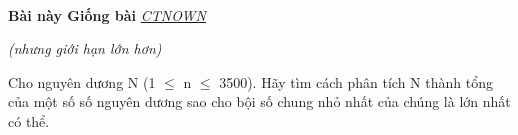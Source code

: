  

\textbf{Bài này Giống bài }\href{http://vnoi.info/problems/show/CTNOWN/}{\emph{ CTNOWN}}

\emph{(nhưng giới hạn lớn hơn) }

Cho nguyên dương N (1 $\le$ n $\le$ 3500). Hãy tìm cách phân tích N thành tổng của một số số nguyên dương sao cho bội số chung nhỏ nhất của chúng là lớn nhất có thể.